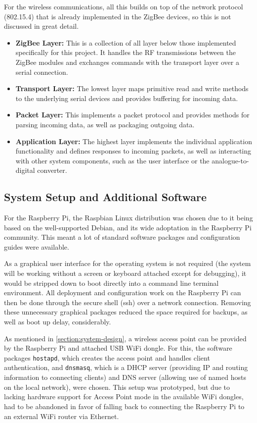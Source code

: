 For the wireless communications, all this builds on top of the network protocol (802.15.4) that is already implemented in the ZigBee devices, so this is not discussed in great detail.

\begin{itemize}
	\item \textbf{ZigBee Layer:} This is a collection of all layer below those implemented specifically for this project. It handles the RF transmissions between the ZigBee modules and exchanges commands with the transport layer over a serial connection.
	\item \textbf{Transport Layer:} The lowest layer maps primitive read and write methods to the underlying serial devices and provides buffering for incoming data.
	\item \textbf{Packet Layer:} This implements a packet protocol and provides methods for parsing incoming data, as well as packaging outgoing data.
	\item \textbf{Application Layer:} The highest layer implements the individual application functionality and defines responses to incoming packets, as well as interacting with other system components, such as the user interface or the analogue-to-digital converter.
\end{itemize}

\subsection{System Setup and Additional Software}
For the Raspberry Pi, the Raspbian Linux\cite{raspbian} distribution was chosen due to it being based on the well-supported Debian, and its wide adoptation in the Raspberry Pi community. This meant a lot of standard software packages and configuration guides were available.

As a graphical user interface for the operating system is not required (the system will be working without a screen or keyboard attached except for debugging), it would be stripped down to boot directly into a command line terminal environment. All deployment and configuration work on the Raspberry Pi can then be done through the secure shell (ssh) over a network connection. Removing these unnecessary graphical packages reduced the space required for backups, as well as boot up delay, considerably.

As mentioned in \ref{section:system-design}, a wireless access point can be provided by the Raspberry Pi and attached USB WiFi dongle. For this, the software packages \texttt{hostapd}\cite{hostapd}, which creates the access point and handles client authentication, and \texttt{dnsmasq}\cite{dnsmasq}, which is a DHCP server (providing IP and routing information to connecting clients) and DNS server (allowing use of named hosts on the local network), were chosen. This setup was prototyped, but due to lacking hardware support for Access Point mode in the available WiFi dongles, had to be abandoned in favor of falling back to connecting the Raspberry Pi to an external WiFi router via Ethernet.
